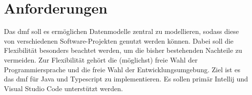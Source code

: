 \documentclass[./einleitung.tex]{subfiles}
\begin{document}
\section{Anforderungen}\label{sec:aufgabenstellung}
Das \acrfull{dmf} soll es ermöglichen Datenmodelle zentral zu modellieren, sodass diese von verschiedenen Software-Projekten genutzt werden können.
Dabei soll die Flexibilität besonders beachtet werden, um die bisher bestehenden Nachteile zu vermeiden.
Zur Flexibilität gehört die (möglichst) freie Wahl der Programmiersprache und die freie Wahl der Entwicklungsumgebung.
\newline
Ziel ist es das \acrshort{dmf} für Java und Typescript zu implementieren.
Es sollen primär Intellij und Visual Studio Code unterstützt werden.
\end{document}
